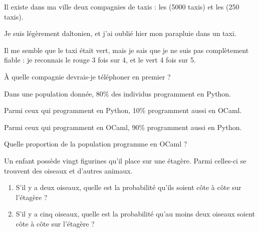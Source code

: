 \begin{corr}
\end{corr}

\begin{exo}[Exercice 4]
Il existe dans ma ville deux compagnies de taxis : les  (5000 taxis) et les  (250 taxis).

Je suis légèrement daltonien, et j'ai oublié hier mon parapluie dans un taxi.

Il me semble que le taxi était vert, mais je sais que je ne suis pas complètement fiable : je reconnais le rouge 3 fois sur 4, et le vert 4 fois sur 5.

À quelle compagnie devrais-je téléphoner en premier ?
\end{exo}

\begin{corr}
\end{corr}

\begin{exo}[Exercice 5]
Dans une population donnée, 80\% des individus programment en Python.

Parmi ceux qui programment en Python, 10\% programment aussi en OCaml.

Parmi ceux qui programment en OCaml, 90\% programment aussi en Python.

Quelle proportion de la population programme en OCaml ?
\end{exo}

\begin{corr}
\end{corr}

\begin{exo}
Un enfant possède vingt figurines qu'il place sur une étagère. Parmi celles-ci se trouvent des oiseaux et d'autres animaux.

\begin{enumerate}
    \item S'il y a deux oiseaux, quelle est la probabilité qu'ils soient côte à côte sur l'étagère ? \\
    \item S'il y a cinq oiseaux, quelle est la probabilité qu'au moins deux oiseaux soient côte à côte sur l'étagère ?
\end{enumerate}
\end{exo}

\begin{corr}
\end{corr}

